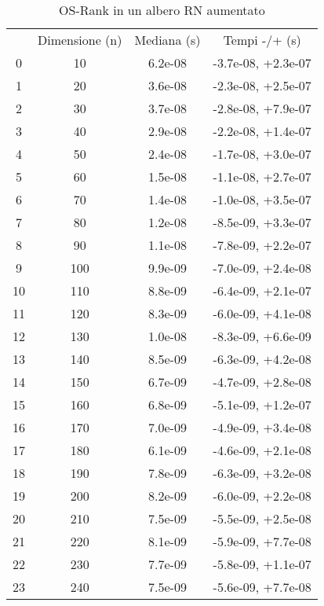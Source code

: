 \begin{table}
\centering
\caption{OS-Rank in un albero RN aumentato}
\label{OS-Rank in un albero RN aumentato}
\begin{adjustbox}{width=1\textwidth/2}
\begin{tabular}{|c|c|c|c|}
\hline
 & Dimensione (n) & Mediana (s) & Tempi -/+ (s) \\
0 & 10 & 6.2e-08 & -3.7e-08, +2.3e-07 \\
\cline{1-4}
1 & 20 & 3.6e-08 & -2.3e-08, +2.5e-07 \\
\cline{1-4}
2 & 30 & 3.7e-08 & -2.8e-08, +7.9e-07 \\
\cline{1-4}
3 & 40 & 2.9e-08 & -2.2e-08, +1.4e-07 \\
\cline{1-4}
4 & 50 & 2.4e-08 & -1.7e-08, +3.0e-07 \\
\cline{1-4}
5 & 60 & 1.5e-08 & -1.1e-08, +2.7e-07 \\
\cline{1-4}
6 & 70 & 1.4e-08 & -1.0e-08, +3.5e-07 \\
\cline{1-4}
7 & 80 & 1.2e-08 & -8.5e-09, +3.3e-07 \\
\cline{1-4}
8 & 90 & 1.1e-08 & -7.8e-09, +2.2e-07 \\
\cline{1-4}
9 & 100 & 9.9e-09 & -7.0e-09, +2.4e-08 \\
\cline{1-4}
10 & 110 & 8.8e-09 & -6.4e-09, +2.1e-07 \\
\cline{1-4}
11 & 120 & 8.3e-09 & -6.0e-09, +4.1e-08 \\
\cline{1-4}
12 & 130 & 1.0e-08 & -8.3e-09, +6.6e-09 \\
\cline{1-4}
13 & 140 & 8.5e-09 & -6.3e-09, +4.2e-08 \\
\cline{1-4}
14 & 150 & 6.7e-09 & -4.7e-09, +2.8e-08 \\
\cline{1-4}
15 & 160 & 6.8e-09 & -5.1e-09, +1.2e-07 \\
\cline{1-4}
16 & 170 & 7.0e-09 & -4.9e-09, +3.4e-08 \\
\cline{1-4}
17 & 180 & 6.1e-09 & -4.6e-09, +2.1e-08 \\
\cline{1-4}
18 & 190 & 7.8e-09 & -6.3e-09, +3.2e-08 \\
\cline{1-4}
19 & 200 & 8.2e-09 & -6.0e-09, +2.2e-08 \\
\cline{1-4}
20 & 210 & 7.5e-09 & -5.5e-09, +2.5e-08 \\
\cline{1-4}
21 & 220 & 8.1e-09 & -5.9e-09, +7.7e-08 \\
\cline{1-4}
22 & 230 & 7.7e-09 & -5.8e-09, +1.1e-07 \\
\cline{1-4}
23 & 240 & 7.5e-09 & -5.6e-09, +7.7e-08 \\

\end{tabular}
\end{adjustbox}
\end{table}
